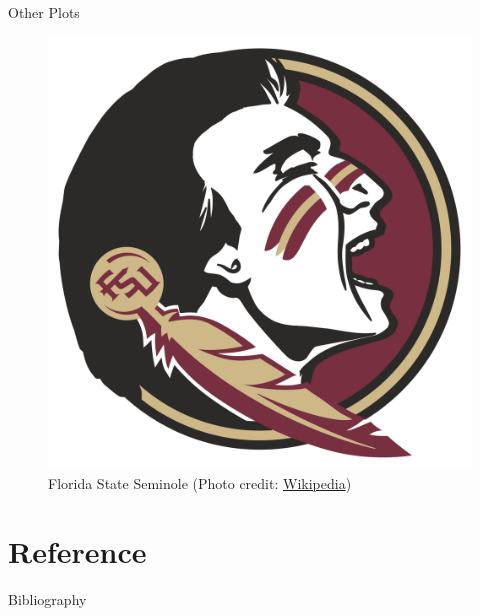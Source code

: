 \documentclass{ctexbeamer}
\begin{document}
\begin{frame}{Other Plots}
    \begin{figure}
    \centering
    \includegraphics[width=0.5\linewidth]{images/seminole.png}
    \caption{ Florida State Seminole (Photo credit: \href{https://en.wikipedia.org/wiki/Florida_State_Seminoles}{Wikipedia})}
    \label{fig:enter-label}
    \end{figure}
\end{frame}
\section{Reference}
\begin{frame}{Bibliography}
    \printbibliography
\end{frame}
\end{document}
